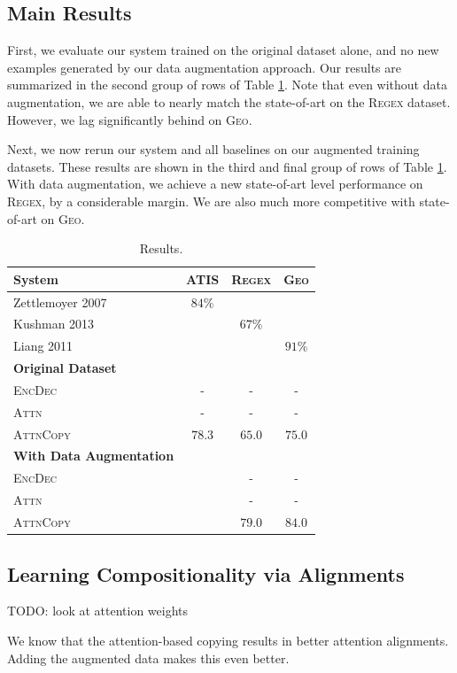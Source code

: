 \documentclass[11pt,letterpaper]{article}
\newcommand{\encdec}{\textsc{EncDec}\xspace}
\newcommand{\attn}{\textsc{Attn}\xspace}
\newcommand{\attncopy}{\textsc{AttnCopy}\xspace}
\newcommand{\atis}{\textsc{ATIS}\xspace}
\newcommand{\regex}{\textsc{Regex}\xspace}
\newcommand{\geo}{\textsc{Geo}\xspace}
\begin{document}
\subsection{Main Results}
First, we evaluate our system trained on the original dataset alone,
and no new examples generated by our data augmentation approach.
Our results are summarized in the second group of rows of Table \ref{tab:results}.
Note that even without data augmentation, we are able to nearly
match the state-of-art on the \regex dataset.
However, we lag significantly behind on \geo.

Next, we now rerun our system and all baselines on our
augmented training datasets.  These results are shown in the
third and final group of rows of Table \ref{tab:results}.
With data augmentation, we achieve a new state-of-art level performance
on \regex, by a considerable margin.  We are also much more competitive
with state-of-art on \geo.

\begin{table}
  \centering
  \small
  \begin{tabular}{|l|c|c|c|}
    \hline
    System & \atis & \regex & \geo \\
    \hline
    Zettlemoyer 2007 & $84\%$ & & \\
    Kushman 2013 & & $67\%$ & \\
    Liang 2011 & & & $91\%$ \\
    \hline
    \textbf{Original Dataset} & & & \\
    \encdec & - & - & - \\
    \attn & - & - & - \\
    \attncopy & $78.3$ & $65.0$ & $75.0$ \\
    \hline
    \textbf{With Data Augmentation} & & & \\
    \encdec & & - & - \\
    \attn & & - & - \\
    \attncopy & & $79.0$ & $84.0$ \\
    \hline
  \end{tabular}
  \caption{Results.}
  \label{tab:results}
\end{table}


\subsection{Learning Compositionality via Alignments}
TODO: look at attention weights

We know that the attention-based copying results in
better attention alignments.
Adding the augmented data makes this even better.
\end{document}
